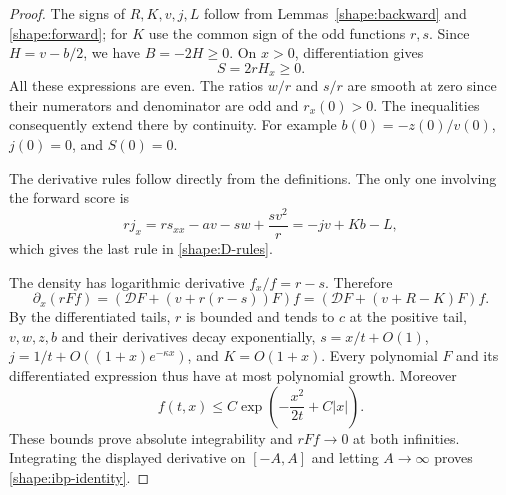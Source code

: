 \begin{proof}
The signs of $R,K,v,j,L$ follow from Lemmas~\ref{shape:backward} and
\ref{shape:forward}; for $K$ use the common sign of the odd functions
$r,s$.  Since $H=v-b/2$, we have $B=-2H\ge0$.
On $x>0$, differentiation gives
\[
 S=2rH_x\ge0.
\]
All these expressions are even.  The ratios $w/r$ and $s/r$ are smooth
at zero since their numerators and denominator are odd and $r_x(0)>0$.
The inequalities consequently extend there by continuity.
For example $b(0)=-z(0)/v(0)$, $j(0)=0$, and $S(0)=0$.

The derivative rules follow directly from the definitions.  The only
one involving the forward score is
\[
 rj_x=r s_{xx}-a v-sw+\frac{s v^2}{r}
     =-jv+Kb-L,
\]
which gives the last rule in \eqref{shape:D-rules}.

The density has logarithmic derivative $f_x/f=r-s$.  Therefore
\[
 \partial_x(rFf)
   =\left(\mathcal DF+(v+r(r-s))F\right)f
   =\left(\mathcal DF+(v+R-K)F\right)f.
\]
By the differentiated tails, $r$ is bounded and tends to $c$ at the
positive tail, $v,w,z,b$ and their derivatives decay exponentially,
$s=x/t+O(1)$, $j=1/t+O((1+x)e^{-\kappa x})$, and $K=O(1+x)$.
Every polynomial $F$ and its differentiated expression thus have at
most polynomial growth.  Moreover
\[
 f(t,x)\le C\exp\left(-\frac{x^2}{2t}+C|x|\right).
\]
These bounds prove absolute integrability and $rFf\to0$ at both
infinities.  Integrating the displayed derivative on $[-A,A]$ and
letting $A\to\infty$ proves \eqref{shape:ibp-identity}.
\end{proof}

